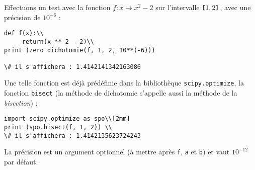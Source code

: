 Effectuons un test avec la fonction $f : x \mapsto x^2-2$ sur l'intervalle $\verb![!1,2\verb!]!$, avec une précision de $10^{-6}$ :
 
\begin{lstlisting}
def f(x):\\
     return(x ** 2 - 2)\\
print (zero dichotomie(f, 1, 2, 10**(-6)))

\# il s'affichera : 1.4142141342163086
\end{lstlisting}
%
% 

Une telle fonction est déjà prédéfinie dans la bibliothèque \texttt{scipy.optimize}, la fonction \texttt{bisect} \linebreak (la méthode de dichotomie s'appelle aussi la méthode de la \textit{bisection}) : 
\begin{lstlisting}
import scipy.optimize as spo\\[2mm]
print (spo.bisect(f, 1, 2)) \\
\# il s'affichera : 1.4142135623724243
\end{lstlisting}
La précision est un argument optionnel (à mettre après \texttt{f}, \texttt{a} et \texttt{b}) et vaut $10^{-12}$ par défaut.





